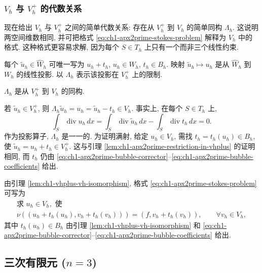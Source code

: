 \subsubsection*{\texorpdfstring{$V_h$ 与 $V_h^+$}{Vh and Vh+} 的代数关系}

现在给出 $V_h$ 与 $V_h^+$ 之间的简单代数关系: 存在从 $V_h^+$ 到 $V_h$ 的简单同构 $\Lambda_h$. 这说明两空间维数相同, 并可把格式 \eqref{eq:ch1-apx2prime-stokes-problem} 解释为 $V_h$ 中的格式. 这种格式更容易求解, 因为每个 $S\in T_h$ 上只有一个而非三个线性约束.

每个 $\widetilde u_h\in\widehat W_h$ 可唯一写为
$u_h+t_h$, $u_h\in W_h$, $t_h\in B_h$. 映射
$\widetilde u_h\mapsto u_h$ 是从 $\widehat W_h$ 到 $W_h$ 的线性投影. 以 $\Lambda_h$ 表示该投影在 $V_h^+$ 上的限制.

\begin{Lemma}
\label{lem:ch1-vhplus-vh-isomorphism}
$\Lambda_h$ 是从 $V_h^+$ 到 $V_h$ 的同构.
\end{Lemma}

\begin{Proof}
若 $\widetilde u_h\in V_h^+$, 则
$\Lambda_h\widetilde u_h=u_h=\widetilde u_h-t_h\in V_h$. 事实上, 在每个 $S\in T_h$ 上,
\[
\int_S\operatorname{div}u_h\,dx
=\int_S\operatorname{div}\widetilde u_h\,dx
-\int_S\operatorname{div}t_h\,dx=0.
\]
作为投影算子, $\Lambda_h$ 是一一的. 为证明满射, 给定 $u_h\in V_h$, 需找 $t_h=t_h(u_h)\in B_h$, 使
$\widetilde u_h=u_h+t_h\in V_h^+$. 这与引理
\ref{lem:ch1-apx2prime-restriction-in-vhplus} 的证明相同, 而 $t_h$ 仍由
\eqref{eq:ch1-apx2prime-bubble-corrector}--\eqref{eq:ch1-apx2prime-bubble-coefficients} 给出.
\end{Proof}

由引理 \ref{lem:ch1-vhplus-vh-isomorphism}, 格式
\eqref{eq:ch1-apx2prime-stokes-problem} 可写为
\begin{equation}
\begin{gathered}
\text{求 }u_h\in V_h,\text{ 使}\\
\nu((u_h+t_h(u_h),v_h+t_h(v_h)))
=(f,v_h+t_h(v_h)),\qquad\forall v_h\in V_h,
\end{gathered}
\label{eq:ch1-apx2prime-vh-scheme}
\end{equation}
其中 $t_h(u_h)\in B_h$ 由引理 \ref{lem:ch1-vhplus-vh-isomorphism} 和
\eqref{eq:ch1-apx2prime-bubble-corrector}--\eqref{eq:ch1-apx2prime-bubble-coefficients} 给出.

\subsection{\texorpdfstring{三次有限元 ($n=3$)}{三次有限元 (n=3)}}
\label{subsec:ch1-degree-three-elements}

